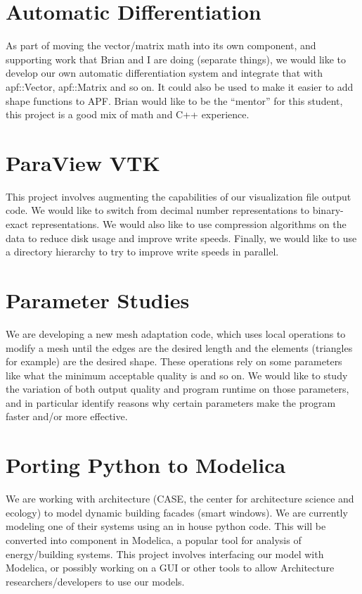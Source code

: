 \documentclass[12pt]{article}
\begin{document}
\maketitle

\section{Automatic Differentiation} 
As part of moving the vector/matrix math into its own component, and supporting
work that Brian and I are doing (separate things), we would like to develop our
own automatic differentiation system and integrate that with apf::Vector,
apf::Matrix and so on. It could also be used to make it easier to add shape
functions to APF. Brian would like to be the “mentor” for this student, this
project is a good mix of math and C++ experience.

\section{ParaView VTK} 
This project involves augmenting the capabilities of our visualization file
output code. We would like to switch from decimal number representations to
binary-exact representations. We would also like to use compression algorithms
on the data to reduce disk usage and improve write speeds. Finally, we would
like to use a directory hierarchy to try to improve write speeds in parallel.

\section{Parameter Studies}
We are developing a new mesh adaptation code, which uses local operations to
modify a mesh until the edges are the desired length and the elements
(triangles for example) are the desired shape. These operations rely on some
parameters like what the minimum acceptable quality is and so on. We would like
to study the variation of both output quality and program runtime on those
parameters, and in particular identify reasons why certain parameters make the
program faster and/or more effective.

\section{Porting Python to Modelica} 
We are working with architecture (CASE, the center for architecture science and
ecology) to model dynamic building facades (smart windows). We are currently
modeling one of their systems using an in house python code. This will be
converted into  component in Modelica, a popular tool for analysis of
energy/building systems. This project involves interfacing our model with
Modelica, or possibly working on a GUI or other tools to allow Architecture
researchers/developers to use our models.
\end{document}
